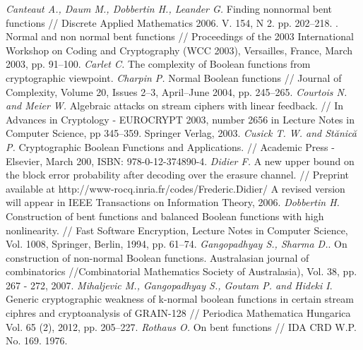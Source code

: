 \begin{thebibliography}{99}
 {\it Canteaut A., Daum M., Dobbertin H., Leander G.} Finding nonnormal bent functions // Discrete Applied Mathematics 2006. V. 154, N 2. pp. 202–218.
. Normal and non normal bent functions // Proceedings of the 2003 International Workshop on Coding and Cryptography (WCC 2003), Versailles, France, March 2003, pp. 91–100.
 {\it Carlet C.} The complexity of Boolean functions from cryptographic viewpoint.
 {\it Charpin P.} Normal Boolean functions // Journal of Complexity, Volume 20, Issues 2–3, April–June 2004, pp. 245–265.
 {\it Courtois N. and Meier W.} Algebraic attacks on stream ciphers with linear feedback. // In Advances in Cryptology - EUROCRYPT 2003, number 2656 in Lecture Notes in Computer Science, pp 345–359. Springer Verlag,  2003.
 {\it Cusick T. W. and Stănică P.} Cryptographic Boolean Functions and Applications. // Academic Press - Elsevier, March 200, ISBN: 978-0-12-374890-4.
 {\it Didier F.} A new upper bound on the block error probability after decoding over the erasure channel. // Preprint available at http://www-rocq.inria.fr/codes/Frederic.Didier/ A revised version will appear in IEEE Transactions on Information Theory, 2006.
 {\it Dobbertin H.} Construction of bent functions and balanced Boolean functions with high nonlinearity. // Fast Software Encryption, Lecture Notes in Computer Science, Vol. 1008, Springer, Berlin, 1994, pp. 61–74.
 {\it Gangopadhyay S., Sharma D.}. On construction of non-normal Boolean functions. Australasian journal of combinatorics //Combinatorial Mathematics Society of Australasia), Vol. 38, pp. 267 - 272, 2007.
 {\it Mihaljevic M., Gangopadhyay S., Goutam P. and Hideki I}. Generic cryptographic weakness of k-normal boolean functions in certain stream ciphres and cryptoanalysis of GRAIN-128 // Periodica Mathematica Hungarica Vol. 65 (2), 2012, pp. 205–227.
 {\it Rothaus O.} On bent functions // IDA CRD W.P. No. 169. 1976.

\end{thebibliography}
